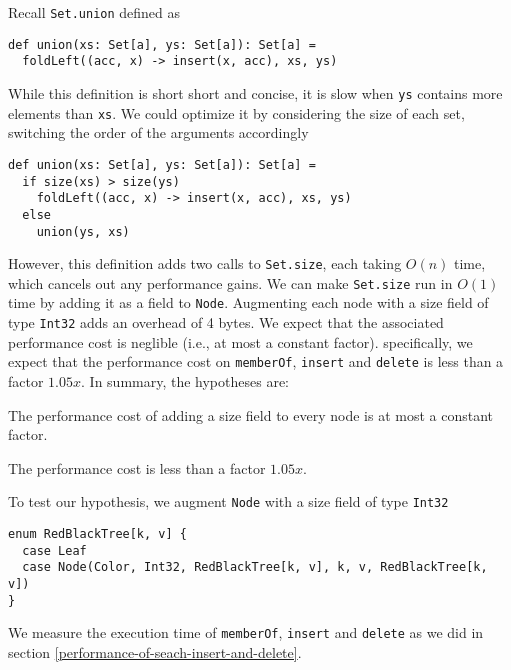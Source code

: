 \documentclass[../main.tex]{subfiles}
\begin{document}
Recall \lstinline{Set.union} defined as
\begin{lstlisting}[language=Flix]
def union(xs: Set[a], ys: Set[a]): Set[a] =
  foldLeft((acc, x) -> insert(x, acc), xs, ys)
\end{lstlisting}
While this definition is short short and concise, it is slow when \lstinline{ys} contains more elements than \lstinline{xs}. We could optimize it by considering the size of each set, switching the order of the arguments accordingly
\begin{lstlisting}[language=Flix]
def union(xs: Set[a], ys: Set[a]): Set[a] =
  if size(xs) > size(ys)
    foldLeft((acc, x) -> insert(x, acc), xs, ys)
  else
    union(ys, xs)
\end{lstlisting}
However, this definition adds two calls to \lstinline{Set.size}, each taking $O(n)$ time, which cancels out any performance gains. We can make \lstinline{Set.size} run in $O(1)$ time by adding it as a field to \lstinline{Node}. Augmenting each node with a size field of type \lstinline{Int32} adds an overhead of 4 bytes. We expect that the associated performance cost is neglible (i.e., at most a constant factor). specifically, we expect that the performance cost on \lstinline{memberOf}, \lstinline{insert} and \lstinline{delete} is less than a factor $1.05x$. In summary, the hypotheses are:

\begin{hypothesis}
The performance cost of adding a size field to every node is at most a constant factor.
\end{hypothesis}

\begin{hypothesis}
The performance cost is less than a factor $1.05x$.
\end{hypothesis}

To test our hypothesis, we augment \lstinline{Node} with a size field of type \lstinline{Int32}
\begin{lstlisting}[language=Flix]
enum RedBlackTree[k, v] {
  case Leaf
  case Node(Color, Int32, RedBlackTree[k, v], k, v, RedBlackTree[k, v])
}
\end{lstlisting}
We measure the execution time of \lstinline{memberOf}, \lstinline{insert} and \lstinline{delete} as we did in section \ref{performance-of-seach-insert-and-delete}.
\end{document}
